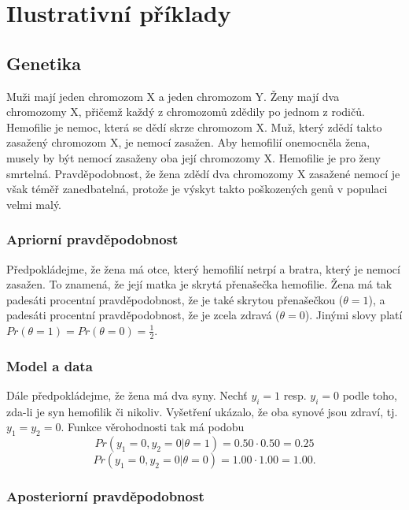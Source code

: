 \section{Ilustrativní příklady}

\subsection{Genetika}

Muži mají jeden chromozom X a jeden chromozom Y. Ženy mají dva chromozomy X, přičemž každý z chromozomů zdědily po jednom z rodičů. Hemofilie je nemoc, která se dědí skrze chromozom X. Muž, který zdědí takto zasažený chromozom X, je nemocí zasažen. Aby hemofilií onemocněla žena, musely by být nemocí zasaženy oba její chromozomy X. Hemofilie je pro ženy smrtelná. Pravděpodobnost, že žena zdědí dva chromozomy X zasažené nemocí je však téměř zanedbatelná, protože je výskyt takto poškozených genů v populaci velmi malý.

\subsubsection{Apriorní pravděpodobnost}

Předpokládejme, že žena má otce, který hemofilií netrpí a bratra, který je nemocí zasažen. To znamená, že její matka je skrytá přenašečka  hemofilie. Žena má tak padesáti procentní pravděpodobnost, že je také skrytou přenašečkou ($\theta = 1$), a padesáti procentní pravděpodobnost, že je zcela zdravá ($\theta = 0$). Jinými slovy platí $Pr(\theta = 1) = Pr(\theta = 0) = \frac{1}{2}$.

\subsubsection{Model a data}

Dále předpokládejme, že žena má dva syny. Nechť $y_i = 1$ resp. $y_i = 0$ podle toho, zda-li je syn hemofilik či nikoliv. Vyšetření ukázalo, že oba synové jsou zdraví, tj. $y_1 = y_2 = 0$. Funkce věrohodnosti tak má podobu
\begin{equation*}
Pr(y_1 = 0, y_2 = 0 | \theta = 1) = 0.50 \cdot 0.50 = 0.25
\end{equation*}
\begin{equation*}
Pr(y_1 = 0, y_2 = 0 | \theta = 0) = 1.00 \cdot 1.00 = 1.00.
\end{equation*}

\subsubsection{Aposteriorní pravděpodobnost}

